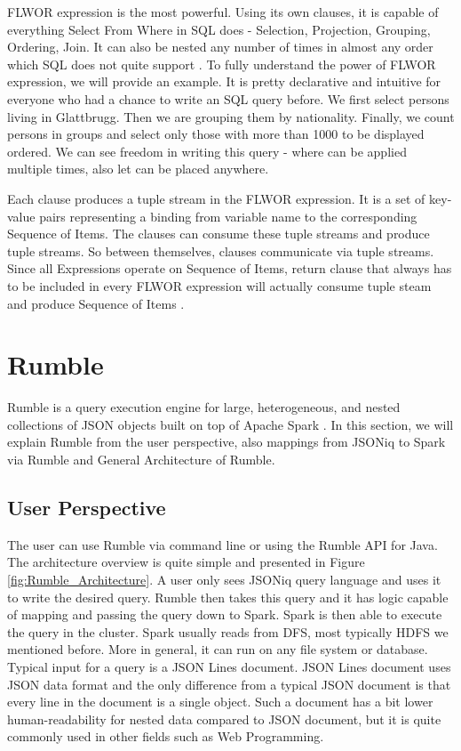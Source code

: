 FLWOR expression is the most powerful. Using its own clauses, it is capable of everything Select From Where in SQL does - Selection, Projection, Grouping, Ordering, Join. It can also be nested any number of times in almost any order which SQL does not quite support \cite{JSONiqBook}. To fully understand the power of FLWOR expression, we will provide an example. It is pretty declarative and intuitive for everyone who had a chance to write an SQL query before. We first select persons living in Glattbrugg. Then we are grouping them by nationality. Finally, we count persons in groups and select only those with more than 1000 to be displayed ordered. We can see freedom in writing this query - where can be applied multiple times, also let can be placed anywhere.



Each clause produces a tuple stream in the FLWOR expression. It is a set of key-value pairs representing a binding from variable name to the corresponding Sequence of Items. The clauses can consume these tuple streams and produce tuple streams. So between themselves, clauses communicate via tuple streams. Since all Expressions operate on Sequence of Items, return clause that always has to be included in every FLWOR expression will actually consume tuple steam and produce Sequence of Items \cite{JSONiqBook}.
   
\section{Rumble}
Rumble is a query execution engine for large, heterogeneous, and nested collections of JSON objects built on top of Apache Spark \cite{RumblePaper}. In this section, we will explain Rumble from the user perspective, also mappings from JSONiq to Spark via Rumble and General Architecture of Rumble.
\subsection{User Perspective}
The user can use Rumble via command line or using the Rumble API for Java. The architecture overview is quite simple and presented in Figure \ref{fig:Rumble_Architecture}. A user only sees JSONiq query language and uses it to write the desired query. Rumble then takes this query and it has logic capable of mapping and passing the query down to Spark. Spark is then able to execute the query in the cluster. Spark usually reads from DFS, most typically HDFS we mentioned before. More in general, it can run on any file system or database. Typical input for a query is a JSON Lines document. JSON Lines document uses JSON data format and the only difference from a typical JSON document is that every line in the document is a single object. Such a document has a bit lower human-readability for nested data compared to JSON document, but it is quite commonly used in other fields such as Web Programming. \cite{RumbleYouTube}

